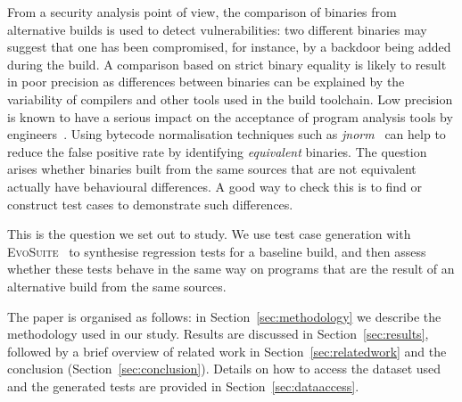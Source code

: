 \documentclass[conference]{IEEEtran}
\makeatletter
\newcommand{\evosuite}{\textsc{EvoSuite}\@\xspace}
\newcommand{\valerio}[1]{\textbf{\textcolor{blue}{[ \ding{46}Valerio: #1]}}}
\newcommand{\tim}[1]{\textbf{\textcolor{violet}{[ \ding{46}Tim: #1]}}}
\renewcommand{\valerio}[1]{}
\renewcommand{\tim}[1]{}
\makeatother
\begin{document}
From a security analysis point of view, the comparison of binaries from alternative builds is used to detect vulnerabilities: two different binaries may suggest that one has been compromised, for instance, by a backdoor being added during the build. A comparison based on strict binary equality is likely to result in poor precision as differences between binaries can be explained by the variability of compilers and other tools used in the build toolchain. Low precision is known to have a serious impact on the acceptance of program analysis tools by engineers~\cite{sadowski2018lessons,distefano2019scaling}. Using bytecode normalisation techniques such as \textit{jnorm}~\cite{schott2024JNorm} can help to reduce the false positive rate by identifying \textit{equivalent} binaries. The question arises whether binaries built from the same sources that are not equivalent actually have behavioural differences. A good way to check this is to find or construct test cases to demonstrate such differences.

\valerio{I think we should frame this paper as Emerging Results paper following the call for papers. what do you think ? We should not present it as a study, but we should focus on the idea itself}
\tim{Valerio, it looks like the 2 categories for short papers call for papers are:
	\begin{enumerate}
		\item Groundbreaking research papers: Exciting new directions or techniques that may have yet to be supported by solid experimental results but supported by strong and well-argued scientific intuitions.
		\item Reflection papers: Bold and unexpected results and reflections that challenge the existing research outcomes and help us look at current research directions in a new light, calling for fundamentally new future research directions.
	\end{enumerate}
	Which are you thinking is more suitable? I'm thinking ``reflection paper''.
}
This is the question we set out to study. We use test case generation with \evosuite~\cite{fraser2011evosuite} to synthesise regression tests for a baseline build, and then assess whether these tests behave in the same way on programs that are the result of an alternative  build from the same sources. 

The paper is organised as follows: in Section~\ref{sec:methodology} we describe the methodology used in our study.  Results are discussed in Section~\ref{sec:results}, followed by a brief overview of related work in Section~\ref{sec:relatedwork} and the conclusion (Section~\ref{sec:conclusion}). Details on how to access the dataset used and the generated tests are provided in Section~\ref{sec:dataaccess}. 
\end{document}
